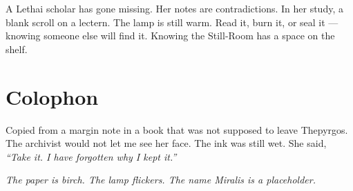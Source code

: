 A Lethai scholar has gone missing. Her notes are contradictions. In her study, a blank scroll on a lectern. The lamp is still warm. Read it, burn it, or seal it --- knowing someone else will find it. Knowing the Still-Room has a space on the shelf.

\section*{Colophon}

Copied from a margin note in a book that was not supposed to leave Thepyrgos. The archivist would not let me see her face. The ink was still wet. She said, \emph{``Take it. I have forgotten why I kept it.''}

\noindent \textit{The paper is birch. The lamp flickers. The name Miralis is a placeholder.}